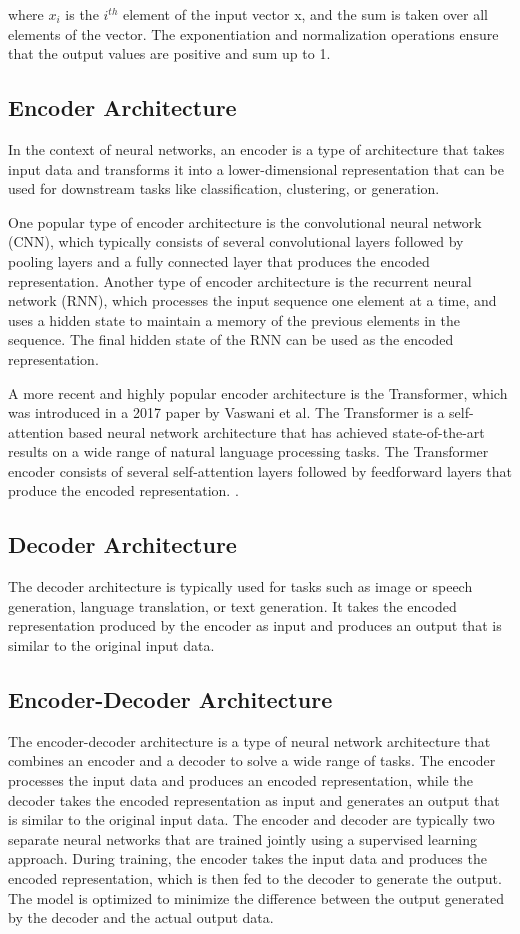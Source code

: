 \documentclass[12pt]{report}
\begin{document}
where {$x_i$} is the {$i^{th}$} element of the input vector x, and the sum is taken over all elements of the vector. The exponentiation and normalization operations ensure that the output values are positive and sum up to 1.
 \subsection{Encoder Architecture}
In the context of neural networks, an encoder is a type of architecture that takes input data and transforms it into a lower-dimensional representation that can be used for downstream tasks like classification, clustering, or generation.

One popular type of encoder architecture is the convolutional neural network (CNN), which typically consists of several convolutional layers followed by pooling layers and a fully connected layer that produces the encoded representation. Another type of encoder architecture is the recurrent neural network (RNN), which processes the input sequence one element at a time, and uses a hidden state to maintain a memory of the previous elements in the sequence. The final hidden state of the RNN can be used as the encoded representation.

A more recent and highly popular encoder architecture is the Transformer, which was introduced in a 2017 paper by Vaswani et al.{\cite{vaswani2017}} The Transformer is a self-attention based neural network architecture that has achieved state-of-the-art results on a wide range of natural language processing tasks. The Transformer encoder consists of several self-attention layers followed by feedforward layers that produce the encoded representation.
.
 \subsection{Decoder Architecture}
The decoder architecture is typically used for tasks such as image or speech generation, language translation, or text generation. It takes the encoded representation produced by the encoder as input and produces an output that is similar to the original input data.

 \subsection{Encoder-Decoder Architecture}
The encoder-decoder architecture is a type of neural network architecture that combines an encoder and a decoder to solve a wide range of tasks. The encoder processes the input data and produces an encoded representation, while the decoder takes the encoded representation as input and generates an output that is similar to the original input data. The encoder and decoder are typically two separate neural networks that are trained jointly using a supervised learning approach. During training, the encoder takes the input data and produces the encoded representation, which is then fed to the decoder to generate the output. The model is optimized to minimize the difference between the output generated by the decoder and the actual output data.
\end{document}
